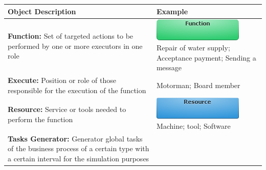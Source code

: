 \documentclass[]{book}
\begin{document}
\begin{longtable}[]{@{}ll@{}}
\toprule
\begin{minipage}[b]{0.46\columnwidth}\raggedright
Object Description\strut
\end{minipage} & \begin{minipage}[b]{0.48\columnwidth}\raggedright
Example\strut
\end{minipage}\tabularnewline
\midrule
\endhead
\begin{minipage}[t]{0.46\columnwidth}\raggedright
\textbf{Function:} Set of targeted actions to be performed by one or more executors in one role\strut
\end{minipage} & \begin{minipage}[t]{0.48\columnwidth}\raggedright
\includegraphics{images/function.png} \newline      Repair of water supply; Acceptance payment; Sending a message\strut
\end{minipage}\tabularnewline
\begin{minipage}[t]{0.46\columnwidth}\raggedright
\textbf{Execute:} Position or role of those responsible for the execution of the function\strut
\end{minipage} & \begin{minipage}[t]{0.48\columnwidth}\raggedright
Motorman; Board member\strut
\end{minipage}\tabularnewline
\begin{minipage}[t]{0.46\columnwidth}\raggedright
\textbf{Resource:} Service or tools needed to perform the function\strut
\end{minipage} & \begin{minipage}[t]{0.48\columnwidth}\raggedright
\includegraphics{images/resource.png} \newline Machine; tool; Software\strut
\end{minipage}\tabularnewline
\begin{minipage}[t]{0.46\columnwidth}\raggedright
\textbf{Tasks Generator:} Generator global tasks of the business process of a certain type with a certain interval for the simulation purposes\strut
\end{minipage} & \begin{minipage}[t]{0.48\columnwidth}\raggedright

\end{minipage}
\end{longtable}
\end{document}
